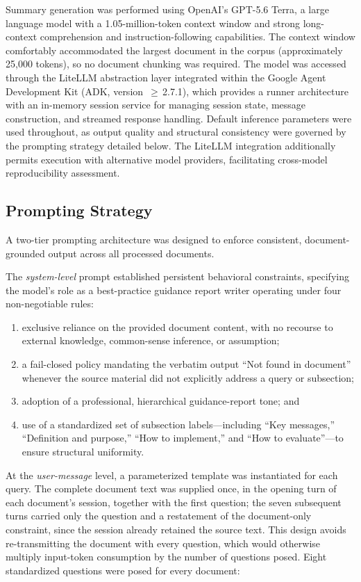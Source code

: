 \documentclass[12pt, a4paper]{article}
\begin{document}
Summary generation was performed using OpenAI's GPT-5.6 Terra, a large language model with a 1.05-million-token context window and strong long-context comprehension and instruction-following capabilities. The context window comfortably accommodated the largest document in the corpus (approximately 25{,}000 tokens), so no document chunking was required. The model was accessed through the LiteLLM abstraction layer integrated within the Google Agent Development Kit (ADK, version~$\geq$\,2.7.1), which provides a runner architecture with an in-memory session service for managing session state, message construction, and streamed response handling. Default inference parameters were used throughout, as output quality and structural consistency were governed by the prompting strategy detailed below. The LiteLLM integration additionally permits execution with alternative model providers, facilitating cross-model reproducibility assessment.

\subsection*{Prompting Strategy}

A two-tier prompting architecture was designed to enforce consistent, document-grounded output across all processed documents.

The \emph{system-level} prompt established persistent behavioral constraints, specifying the model's role as a best-practice guidance report writer operating under four non-negotiable rules:
%
\begin{enumerate}[label=(\arabic*), nosep, leftmargin=2.4em]
  \item exclusive reliance on the provided document content, with no recourse to external knowledge, common-sense inference, or assumption;
  \item a fail-closed policy mandating the verbatim output ``Not found in document'' whenever the source material did not explicitly address a query or subsection;
  \item adoption of a professional, hierarchical guidance-report tone; and
  \item use of a standardized set of subsection labels---including ``Key messages,'' ``Definition and purpose,'' ``How to implement,'' and ``How to evaluate''---to ensure structural uniformity.
\end{enumerate}

At the \emph{user-message} level, a parameterized template was instantiated for each query. The complete document text was supplied once, in the opening turn of each document's session, together with the first question; the seven subsequent turns carried only the question and a restatement of the document-only constraint, since the session already retained the source text. This design avoids re-transmitting the document with every question, which would otherwise multiply input-token consumption by the number of questions posed. Eight standardized questions were posed for every document:
\end{document}
